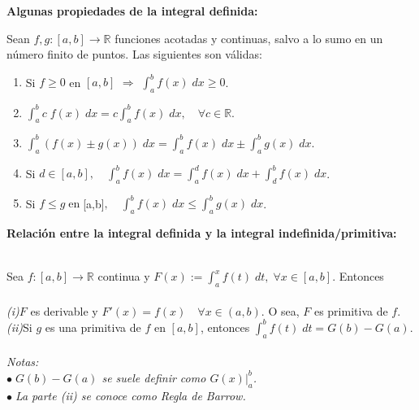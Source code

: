 \documentclass{article}
\theoremstyle{definition}
\theoremstyle{remark}
\newcommand\R{\ensuremath{\mathbb{R}}}
\newcommand\bl{$\bullet\;$}
\begin{document}
\begin{center}
\textbf{Algunas propiedades de la integral definida:}
\end{center}
Sean $f,g : [a,b] \to \R $ funciones acotadas y continuas, salvo a lo sumo en un número finito de puntos. Las siguientes son válidas:
\begin{enumerate}
  \item Si $f \geq 0 $ en $[a,b]$ $\Rightarrow$ $\int_{a}^{b}f(x)\; dx \geq 0$.
  \item $\int_{a}^{b}c\;f(x)\;dx=c\int_{a}^{b}f(x)\;dx,\quad \forall c \in \R $.
  \item $\int_{a}^{b}{(f(x) \pm g(x))\;dx}=\int_{a}^{b}{f(x)} \; dx \pm \int_{a}^{b} {g(x)} \; dx$.
  \item Si $d \in [a,b],\quad  \int_{a}^{b}f(x)\;dx=\int_{a}^{d} f(x)\;dx+\int_{d}^{b} f(x)\;dx$.
  \item Si $f \leq g \; \text{en} \; $[a,b]$, \quad \int_{a}^{b}{f(x)\;dx}\leq\int_{a}^{b}{g(x)\;dx}$.
\end{enumerate}
\pagebreak
\begin{center}
\textbf{Relación entre la integral definida y la integral indefinida/primitiva:}
\end{center}
\begin{teo} \; \\
  Sea $f : [a,b] \to \R $ continua y $F(x):=\int_{a}^{x}f(t)\;dt,\;\forall x \in [a,b]$. Entonces\\\\
  \emph{\phantom{i}(i)}\quad$F$ es derivable y $F'(x)=f(x)\quad \forall x \in (a,b)$. O sea, $F$ es primitiva de $f$. \\
  \emph{(ii)}\quad  Si $g$ es una primitiva de $f$ en $[a,b]$, entonces $\int_{a}^{b}{f(t)\;dt}=G(b)-G(a)$. \\\\
  \emph{Notas: \\ \bl $G(b)-G(a)$ se suele definir como $G(x)|^b_a$. \\\bl La parte (ii) se conoce como \emph{Regla de Barrow}.}
\end{teo}
\end{document}
